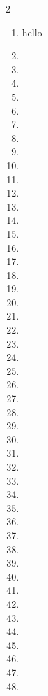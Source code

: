\begin{multicols}{2}
\begin{enumerate}[label={\textbf{\arabic*.}}]
    \begin{align*} 
        285 
    \end{align*}

    
    \item hello
    \item 
    \item
    \item
    \item 
    \item 
    \item 
    \item 
    \item
    \item
    \item
    \item 
    \item
    \item
    \item 
    \item 
    \item 
    \item 
    \item
    \item
    \item
    \item 
    \item
    \item
    \item 
    \item 
    \item 
    \item 
    \item
    \item
    \item
    \item 
    \item
    \item
    \item 
    \item 
    \item 
    \item 
    \item
    \item
    \item
    \item 
    \item
    \item
    \item 
    \item 
    \item 
    \item 

\end{enumerate}
\end{multicols}
